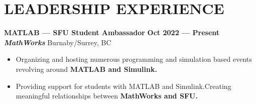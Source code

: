 \documentclass[letterpaper,11pt]{article}
\newcommand{\Item} [1] {
    \item\small{{#1 \vspace{-2pt}}}
}
\newcommand{\employer} [5] {
    {\textbf{#3} \hfill \textbf{#4 --- #5}\\ \textbf{\emph{#1}} \hfill #2\\}
}
\newcommand{\workItemListStart} [0] {
    \vspace{-1pt}
    \begin{itemize}[topsep=0pt,itemsep=-2pt]
}
\newcommand{\workItemListEnd} [0] {
    \end{itemize}
    \vspace{1pt}
}
\begin{document}
    \section{LEADERSHIP EXPERIENCE}
    \employer{MathWorks}{Burnaby/Surrey, BC}{MATLAB --- SFU Student Ambassador}{Oct 2022}{Present}
    \workItemListStart{}
        \Item{Organizing and hosting numerous programming and simulation based events revolving around \textbf{MATLAB and Simulink.}}
        \Item{Providing support for students with MATLAB and Simulink.\@ Creating meaningful relationships between \textbf{MathWorks and SFU.}}
    \workItemListEnd{}
\end{document}
